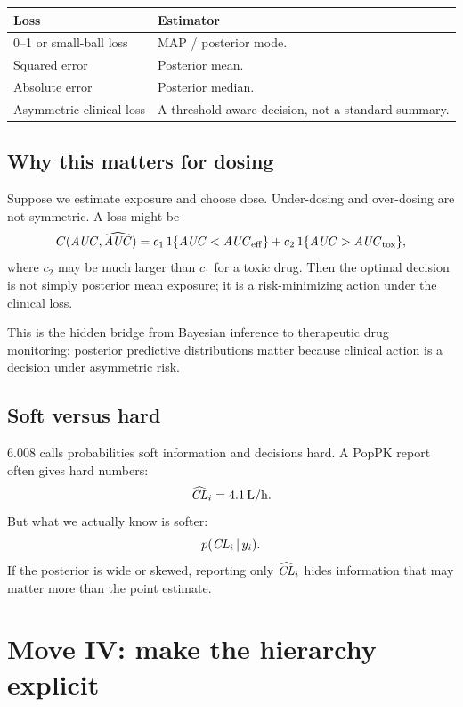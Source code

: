 \documentclass[a4paper]{article}
\newcommand{\given}{\,|\,}
\begin{document}
\begin{center}
\begin{tabularx}{0.96\textwidth}{p{}X}
\toprule
Loss & Estimator \\
\midrule
0--1 or small-ball loss & MAP / posterior mode. \\
Squared error & Posterior mean. \\
Absolute error & Posterior median. \\
Asymmetric clinical loss & A threshold-aware decision, not a standard summary. \\
\bottomrule
\end{tabularx}
\end{center}

\subsection{Why this matters for dosing}

Suppose we estimate exposure and choose dose. Under-dosing and over-dosing are not symmetric. A loss might be
\[
  C(\pksym{AUC},\widehat{\pksym{AUC}})
  =
  c_1\,1\{\pksym{AUC}<\pksym{AUC}_{\mathrm{eff}}\}
  +
  c_2\,1\{\pksym{AUC}>\pksym{AUC}_{\mathrm{tox}}\},
\]
where \(c_2\) may be much larger than \(c_1\) for a toxic drug. Then the optimal decision is not simply posterior mean exposure; it is a risk-minimizing action under the clinical loss.

\begin{remark}
  This is the hidden bridge from Bayesian inference to therapeutic drug monitoring: posterior predictive distributions matter because clinical action is a decision under asymmetric risk.
\end{remark}

\subsection{Soft versus hard}

6.008 calls probabilities soft information and decisions hard. A PopPK report often gives hard numbers:
\[
  \widehat{\pksym{CL}}_i=4.1\,\mathrm{L/h}.
\]
But what we actually know is softer:
\[
  p(\pksym{CL}_i\given y_i).
\]
If the posterior is wide or skewed, reporting only \(\widehat{\pksym{CL}}_i\) hides information that may matter more than the point estimate.

\section{Move IV: make the hierarchy explicit}
\end{document}
